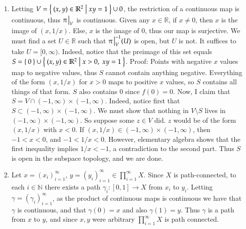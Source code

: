 \documentclass[12pt]{article}
\theoremstyle{definitionstyle}
\def\mbb#1{\mathbb{#1}}
\def\bN{\mbb{N}}
\def \R{\mbb{R}}
\begin{document}
\begin{enumerate}[leftmargin=\labelsep]
		\item Letting $V = \Set{(x, y) \in \R^2 | xy = 1} \cup 0$, the restriction of a continuous map is continuous, thus $\pi \eval_V$ is continuous. Given any $x \in \R$, if $x \neq 0$, then $x$ is the image of $(x, 1/x)$. Else, $x$ is the image of 0, thus our map is surjective. We must find a set $U \in \R$ such that $\pi \eval_{V}^{-1}(U)$ is open, but $U$ is not. It suffices to take $U = [0, \infty)$. Indeed, notice that the preimage of this set equals $S = \Set{0} \cup \Set{(x, y) \in \R^2 | x > 0, \; xy = 1}$. Proof:
		Points with negative $x$ values map to negative values, thus $S$ cannot contain anything negative. Everything of the form $(x, 1/x)$ for $x > 0$ maps to positive $x$ values, so $S$ contains all things of that form. $S$ also contains $0$ since $f(0) = 0$. Now, I claim that $S = V \cap (-1, \infty) \times (-1, \infty)$. Indeed, notice first that $S \subset (-1, \infty) \times (-1, \infty)$. We must show that nothing in $V \setminus S$ lives in $(-1, \infty) \times (-1, \infty)$. So suppose some $z \in V$ did. $z$ would be of the form $(x, 1/x)$ with $x < 0$. If $(x, 1/x) \in (-1, \infty) \times (-1, \infty)$, then $-1 < x < 0$, and $-1 < 1/x < 0$. However, elementary algebra shows that the first inequality implies $1/x < -1$, a contradiction to the second part. Thus $S$ is open in the subspace topology, and we are done.
		
		\item Let $x = (x_i)_{i=1}^\infty$, $y = (y_i)_{i=1}^\infty \in \prod_{i=1}^\infty X$. Since $X$ is path-connected, to each $i \in \bN$ there exists a path $\gamma_i: [0,1] \to X$ from $x_i$ to $y_i$. Letting $\gamma = (\gamma_i)_{i=1}^\infty$, as the product of continuous maps is continuous we have that $\gamma$ is continuous, and that $\gamma(0) = x$ and also $\gamma(1) = y$. Thus $\gamma$ is a path from $x$ to $y$, and since $x, y$ were arbitrary $\prod_{i=1}^\infty X$ is path connected.
		

\end{enumerate}
\end{document}
